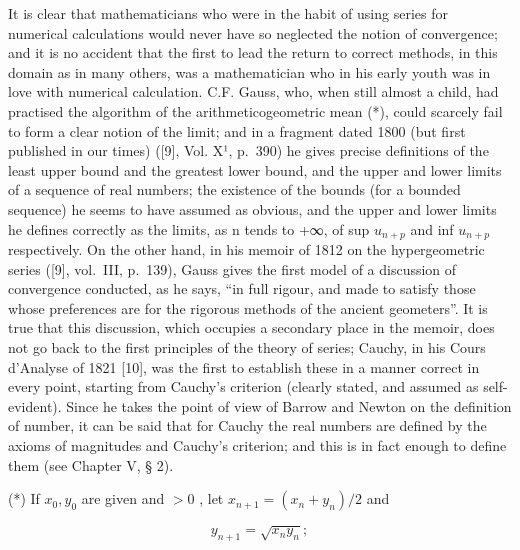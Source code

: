 It is clear that mathematicians who were in the habit of using series for numerical calculations would never have so neglected the notion of convergence; and it is no accident that the first to lead the return to correct methods, in this domain as in many others, was a mathematician who in his early youth was in love with numerical calculation. C.F. Gauss, who, when still almost a child, had practised the algorithm of the arithmeticogeometric mean (*), could scarcely fail to form a clear notion of the limit; and in a fragment dated 1800 (but first published in our times) ({[}9{]}, Vol. X¹, p.~390) he gives precise definitions of the least upper bound and the greatest lower bound, and the upper and lower limits of a sequence of real numbers; the existence of the bounds (for a bounded sequence) he seems to have assumed as obvious, and the upper and lower limits he defines correctly as the limits, as n tends to +∞, of sup \(u_{n+p}\) and inf \(u_{n+p}\) respectively. On the other hand, in his memoir of 1812 on the hypergeometric series ({[}9{]}, vol.~III, p.~139), Gauss gives the first model of a discussion of convergence conducted, as he says, ``in full rigour, and made to satisfy those whose preferences are for the rigorous methods of the ancient geometers''. It is true that this discussion, which occupies a secondary place in the memoir, does not go back to the first principles of the theory of series; Cauchy, in his Cours d'Analyse of 1821 {[}10{]}, was the first to establish these in a manner correct in every point, starting from Cauchy's criterion (clearly stated, and assumed as self-evident). Since he takes the point of view of Barrow and Newton on the definition of number, it can be said that for Cauchy the real numbers are defined by the axioms of magnitudes and Cauchy's criterion; and this is in fact enough to define them (see Chapter V, § 2).

(*) If \(x_0, y_0\) are given and \(> 0\) , let \(x_{n+1} = (x_n + y_n)/2\) and

\[
y _ {n + 1} = \sqrt {x _ {n} y _ {n}};
\]

